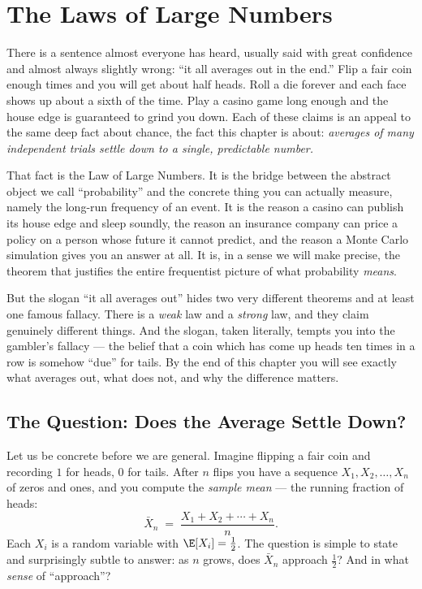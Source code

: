 \chapter{The Laws of Large Numbers}

There is a sentence almost everyone has heard, usually said with great confidence and almost always slightly wrong: ``it all averages out in the end.'' Flip a fair coin enough times and you will get about half heads. Roll a die forever and each face shows up about a sixth of the time. Play a casino game long enough and the house edge is guaranteed to grind you down. Each of these claims is an appeal to the same deep fact about chance, the fact this chapter is about: \emph{averages of many independent trials settle down to a single, predictable number.}

That fact is the Law of Large Numbers. It is the bridge between the abstract object we call ``probability'' and the concrete thing you can actually measure, namely the long-run frequency of an event. It is the reason a casino can publish its house edge and sleep soundly, the reason an insurance company can price a policy on a person whose future it cannot predict, and the reason a Monte Carlo simulation gives you an answer at all. It is, in a sense we will make precise, the theorem that justifies the entire frequentist picture of what probability \emph{means}.

But the slogan ``it all averages out'' hides two very different theorems and at least one famous fallacy. There is a \emph{weak} law and a \emph{strong} law, and they claim genuinely different things. And the slogan, taken literally, tempts you into the gambler's fallacy --- the belief that a coin which has come up heads ten times in a row is somehow ``due'' for tails. By the end of this chapter you will see exactly what averages out, what does not, and why the difference matters.

\chapterline

\section{The Question: Does the Average Settle Down?}
\label{ch20:question}

Let us be concrete before we are general. Imagine flipping a fair coin and recording $1$ for heads, $0$ for tails. After $n$ flips you have a sequence $X_1, X_2, \dots, X_n$ of zeros and ones, and you compute the \emph{sample mean} --- the running fraction of heads:
\[
  \bar{X}_n \;=\; \frac{X_1 + X_2 + \cdots + X_n}{n}.
\]
Each $X_i$ is a random variable with $\E[X_i] = \tfrac12$. The question is simple to state and surprisingly subtle to answer: as $n$ grows, does $\bar{X}_n$ approach $\tfrac12$? And in what \emph{sense} of ``approach''?

